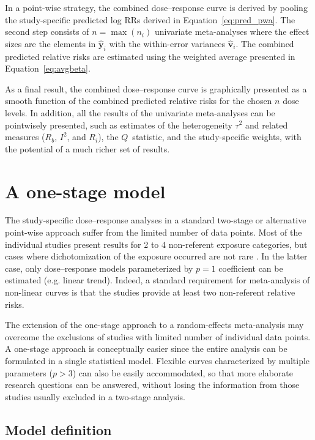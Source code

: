 \documentclass[11pt,a4paper,twoside,openany]{book}\usepackage{knitr}
\begin{document}
{{In a point-wise strategy, the combined dose--response curve is derived by pooling the study-specific predicted log RRs derived in Equation~\ref{eq:pred_pwa}. The second step consists of $n = \max(n_i)$ univariate meta-analyses where the effect sizes are the elements in $\hat {\boldsymbol y}_i$ with the within-error variances $\hat{\boldsymbol{v}}_i$.
The combined predicted relative risks are estimated using the weighted average presented in Equation~\ref{eq:avgbeta}.

As a final result, the combined dose--response curve is graphically presented as a smooth function of the combined predicted relative risks for the chosen $n$ dose levels. In addition, all the results of the univariate meta-analyses can be pointwisely presented, such as estimates of the heterogeneity $\tau^2$ and related measures ($R_b$, $I^2$, and $R_i$), the $Q$~statistic, and the study-specific weights, with the potential of a much richer set of results.


\section{A one-stage model}

The study-specific dose--response analyses in a standard two-stage or alternative point-wise approach suffer from the limited number of data points. Most of the individual studies present results for 2 to 4 non-referent exposure categories, but cases where dichotomization of the exposure occurred are not rare \citep{turner2010categorisation}. In the latter case, only dose--response models parameterized by $p = 1$ coefficient can be estimated (e.g. linear trend). Indeed, a standard requirement for meta-analysis of non-linear curves is that the studies provide at least two non-referent relative risks.

The extension of the one-stage approach to a random-effects meta-analysis may overcome the exclusions of studies with limited number of individual data points. A one-stage approach is conceptually easier since the entire analysis can be formulated in a single statistical model. Flexible curves characterized by multiple parameters ($p > 3$) can also be easily accommodated, so that more elaborate research questions can be answered, without losing the information from those studies usually excluded in a two-stage analysis.

\subsection{Model definition}

}}
\end{document}
